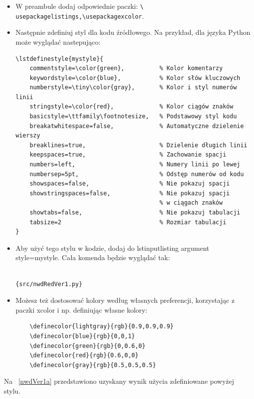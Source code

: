 \begin{itemize}
    \item W preambule dodaj odpowiednie paczki: \texttt{\textbackslash
              usepackage{listings},\textbackslash usepackage{xcolor}}.
    \item Następnie zdefiniuj styl dla kodu źródłowego. Na przykład, dla języka Python może wyglądać nastepująco:
          \small \begin{verbatim}
\lstdefinestyle{mystyle}{
    commentstyle=\color{green},          % Kolor komentarzy
    keywordstyle=\color{blue},           % Kolor słów kluczowych
    numberstyle=\tiny\color{gray},       % Kolor i styl numerów linii
    stringstyle=\color{red},             % Kolor ciągów znaków
    basicstyle=\ttfamily\footnotesize,   % Podstawowy styl kodu
    breakatwhitespace=false,             % Automatyczne dzielenie wierszy
    breaklines=true,                     % Dzielenie długich linii
    keepspaces=true,                     % Zachowanie spacji
    numbers=left,                        % Numery linii po lewej
    numbersep=5pt,                       % Odstęp numerów od kodu
    showspaces=false,                    % Nie pokazuj spacji
    showstringspaces=false,              % Nie pokazuj spacji 
                                         % w ciągach znaków
    showtabs=false,                      % Nie pokazuj tabulacji
    tabsize=2                            % Rozmiar tabulacji
}
    \end{verbatim}

    \item Aby użyć tego stylu w kodzie, dodaj do lstinputlisting argument style=mystyle. Cała komenda będzie wyglądać tak:
          \begin{verbatim}

{src/nwdRedVer1.py}
    \end{verbatim}
    \item Możesz też dostosować kolory według własnych preferencji, korzystając z paczki xcolor i np. definiując własne kolory:
          \begin{verbatim}
    \definecolor{lightgray}{rgb}{0.9,0.9,0.9}
    \definecolor{blue}{rgb}{0,0,1}
    \definecolor{green}{rgb}{0,0.6,0}
    \definecolor{red}{rgb}{0.6,0,0}
    \definecolor{gray}{rgb}{0.5,0.5,0.5}
    \end{verbatim}
\end{itemize}


Na \listingname~\ref{nwdVer1a} przedstawiono uzyskany wynik użycia zdefiniowane powyżej stylu.

